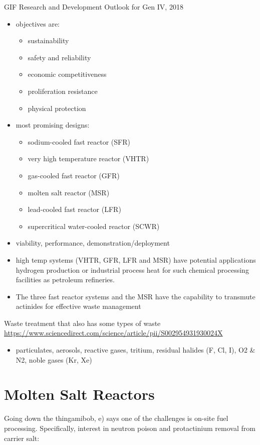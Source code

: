 \documentclass{article}
\begin{document}
\noindent GIF Research and Development Outlook for Gen IV, 2018

\noindent \cite{GIF2018Roadmap}
\begin{itemize}
    \item objectives are: 
    \begin{itemize}
        \item sustainability
        \item safety and reliability
        \item economic competitiveness
        \item proliferation resistance
        \item physical protection
    \end{itemize}
    \item most promising designs:
    \begin{itemize}
        \item sodium-cooled fast reactor (SFR)
        \item very high temperature reactor (VHTR)
        \item gas-cooled fast reactor (GFR)
        \item molten salt reactor (MSR)
        \item lead-cooled fast reactor (LFR)
        \item supercritical water-cooled reactor (SCWR)
    \end{itemize}
    \item viability, performance, demonstration/deployment
    \item high temp systems (VHTR, GFR, LFR and MSR) have potential applications hydrogen production or industrial process heat for such chemical processing facilities as petroleum refineries. 
    \item The three fast reactor systems and the MSR have the capability to transmute actinides for effective waste
management
\end{itemize}

Waste treatment that also has some types of waste
\url{https://www.sciencedirect.com/science/article/pii/S002954931930024X}
\begin{itemize}
    \item particulates, aerosols, reactive gases, tritium, residual halides (F, Cl, I), O2 \& N2, noble gases (Kr, Xe)
\end{itemize}


\section{Molten Salt Reactors}
Going down the thingamibob, e) says one of the challenges is on-site fuel processing. Specifically, interest in neutron poison and protactinium removal from carrier salt:
\end{document}
